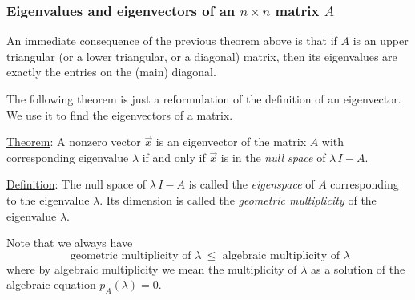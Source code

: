 \documentclass[handout]{beamer}  %
\begin{document}
\begin{frame}
\frametitle{Eigenvalues and eigenvectors of an $n \times n$ matrix $A$}

An immediate consequence of the previous theorem above is that if $A$ is an upper triangular (or a lower triangular, or a diagonal) matrix, then its eigenvalues are exactly the entries on the (main) diagonal.

\medskip

The following theorem is just a reformulation of the definition of an eigenvector. We use it to find the eigenvectors of a matrix.

\medskip

\underline{Theorem}: A nonzero vector $\vec{x}$ is an eigenvector of the matrix $A$ with corresponding eigenvalue $\lambda$ if and only if $\vec{x}$ is in the {\em null space} of $\lambda \, I - A$. 

\medskip

\underline{Definition}:  The null space of $\lambda \, I - A$ is called the {\em eigenspace} of $A$ corresponding to the eigenvalue $\lambda$. Its dimension is called the {\em geometric multiplicity} of the eigenvalue $\lambda$.

\medskip

Note that we always have
$$ \text{ geometric multiplicity of } \lambda \ \le \text{ algebraic multiplicity of } \lambda$$
where by algebraic multiplicity we mean the multiplicity of $\lambda$ as a solution of the algebraic equation $p_A (\lambda) = 0$.
\end{frame}
\end{document}
